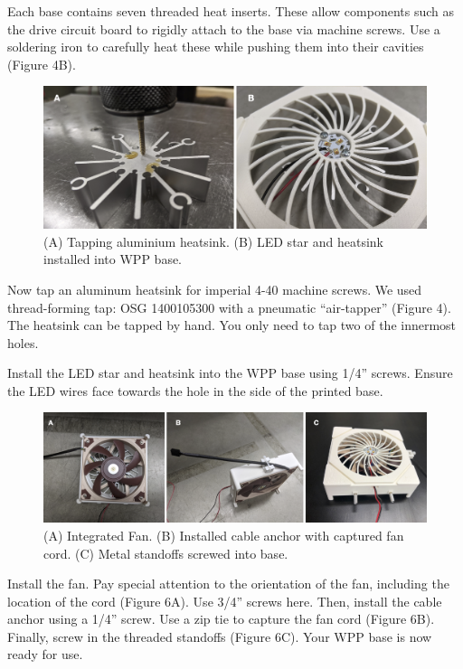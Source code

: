 \documentclass[11pt]{article}
\begin{document}
Each base contains seven threaded heat inserts.
These allow components such as the drive circuit board to rigidly attach to the base via machine screws.
Use a soldering iron to carefully heat these while pushing them into their cavities (Figure 4B).

\begin{figure}[H]
	\includegraphics[width=\textwidth]{"./fig5.png"}
	\caption{(A) Tapping aluminium heatsink. (B) LED star and heatsink installed into WPP base.}
\end{figure}

Now tap an aluminum heatsink for imperial 4-40 machine screws.
We used thread-forming tap: OSG 1400105300 with a pneumatic ``air-tapper'' (Figure 4).
The heatsink can be tapped by hand.
You only need to tap two of the innermost holes.

Install the LED star and heatsink into the WPP base using 1/4'' screws.
Ensure the LED wires face towards the hole in the side of the printed base.

\begin{figure}[H]
	\includegraphics[width=\textwidth]{"./fig6.png"}
	\caption{(A) Integrated Fan. (B) Installed cable anchor with captured fan cord. (C) Metal standoffs screwed into base.}
\end{figure}

Install the fan.
Pay special attention to the orientation of the fan, including the location of the cord (Figure 6A).
Use 3/4'' screws here.
Then, install the cable anchor using a 1/4'' screw.
Use a zip tie to capture the fan cord (Figure 6B).
Finally, screw in the threaded standoffs (Figure 6C).
Your WPP base is now ready for use.
\end{document}
